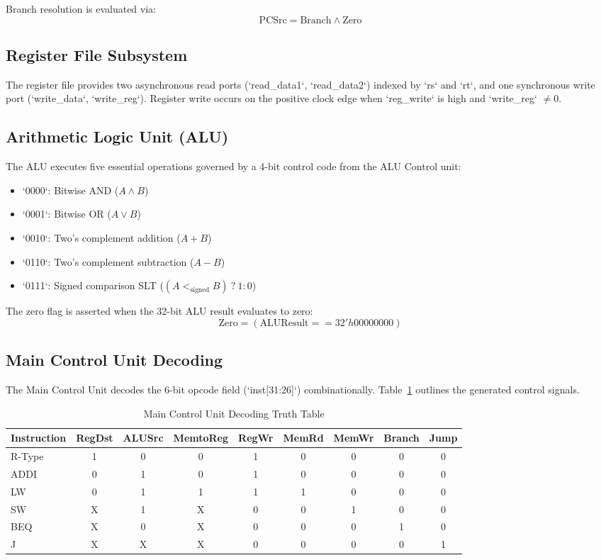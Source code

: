 \documentclass[conference]{IEEEtran}
\begin{document}
Branch resolution is evaluated via:
\begin{equation}
\text{PCSrc} = \text{Branch} \land \text{Zero}
\end{equation}

\subsection{Register File Subsystem}
The register file provides two asynchronous read ports (`read\_data1`, `read\_data2`) indexed by `rs` and `rt`, and one synchronous write port (`write\_data`, `write\_reg`). Register write occurs on the positive clock edge when `reg\_write` is high and `write\_reg` $\neq 0$.

\subsection{Arithmetic Logic Unit (ALU)}
The ALU executes five essential operations governed by a 4-bit control code from the ALU Control unit:
\begin{itemize}
    \item `0000`: Bitwise AND ($A \land B$)
    \item `0001`: Bitwise OR ($A \lor B$)
    \item `0010`: Two's complement addition ($A + B$)
    \item `0110`: Two's complement subtraction ($A - B$)
    \item `0111`: Signed comparison SLT ($(A <_{\text{signed}} B) \ ? \ 1 : 0$)
\end{itemize}
The zero flag is asserted when the 32-bit ALU result evaluates to zero:
\begin{equation}
\text{Zero} = (\text{ALUResult} == 32'h00000000)
\end{equation}

\subsection{Main Control Unit Decoding}
The Main Control Unit decodes the 6-bit opcode field (`inst[31:26]`) combinationally. Table~\ref{tab_control} outlines the generated control signals.

\begin{table}[htbp]
\caption{Main Control Unit Decoding Truth Table}
\label{tab_control}
\centering
\begin{tabular}{lcccccccc}
\toprule
\textbf{Instruction} & \textbf{RegDst} & \textbf{ALUSrc} & \textbf{MemtoReg} & \textbf{RegWr} & \textbf{MemRd} & \textbf{MemWr} & \textbf{Branch} & \textbf{Jump} \\
\midrule
R-Type & 1 & 0 & 0 & 1 & 0 & 0 & 0 & 0 \\
ADDI   & 0 & 1 & 0 & 1 & 0 & 0 & 0 & 0 \\
LW     & 0 & 1 & 1 & 1 & 1 & 0 & 0 & 0 \\
SW     & X & 1 & X & 0 & 0 & 1 & 0 & 0 \\
BEQ    & X & 0 & X & 0 & 0 & 0 & 1 & 0 \\
J      & X & X & X & 0 & 0 & 0 & 0 & 1 \\
\bottomrule
\end{tabular}
\end{table}
\end{document}
